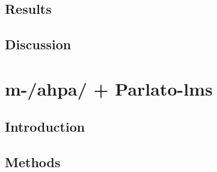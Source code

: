 \subsection{Results}
\subsection{Discussion}



\section{{\color{red}m-/ahpa/ + Parlato-lms}} \label{3-m-ahpa}
\subsection{Introduction}
\subsection{Methods}
